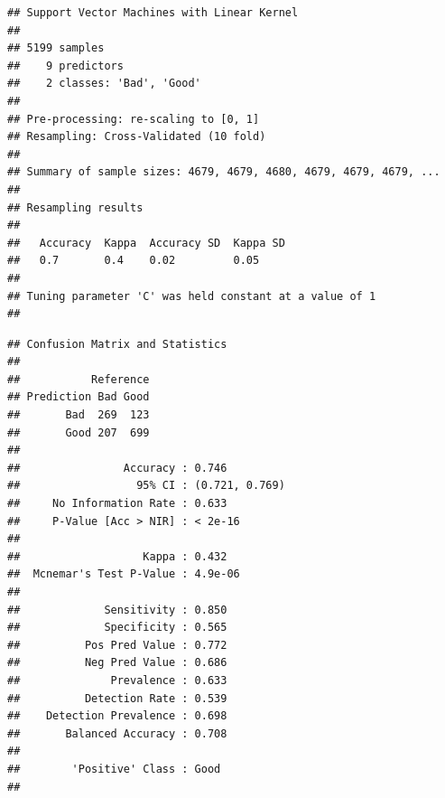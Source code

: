 \documentclass[english,nohyper,titlepage]{tufte-handout}\usepackage{knitr}
\begin{document}
\begin{knitrout}\footnotesize
{}\color{fgcolor}\begin{kframe}
\begin{alltt}
\hlstd{(}\hlstd{)}
 \hlkwb{=} \hlopt{~}  \hlstd{=}\hlstd{,}
                    \hlstd{=}\hlstd{,}  \hlstd{=}\hlstd{)}
\end{alltt}
\begin{verbatim}
## Support Vector Machines with Linear Kernel 
## 
## 5199 samples
##    9 predictors
##    2 classes: 'Bad', 'Good' 
## 
## Pre-processing: re-scaling to [0, 1] 
## Resampling: Cross-Validated (10 fold) 
## 
## Summary of sample sizes: 4679, 4679, 4680, 4679, 4679, 4679, ... 
## 
## Resampling results
## 
##   Accuracy  Kappa  Accuracy SD  Kappa SD
##   0.7       0.4    0.02         0.05    
## 
## Tuning parameter 'C' was held constant at a value of 1
## 
\end{verbatim}
\end{kframe}
\end{knitrout}


\begin{knitrout}\footnotesize
{}\color{fgcolor}\begin{kframe}
\begin{alltt}
 \hlkwb{=} \hlstd{(results_svm, wine_test[,}\hlopt{-}\hlstd{])}
\hlstd{(preds_svm, wine_test[,}\hlstd{],} \hlstd{=}\hlstd{)}
\end{alltt}
\begin{verbatim}
## Confusion Matrix and Statistics
## 
##           Reference
## Prediction Bad Good
##       Bad  269  123
##       Good 207  699
##                                         
##                Accuracy : 0.746         
##                  95% CI : (0.721, 0.769)
##     No Information Rate : 0.633         
##     P-Value [Acc > NIR] : < 2e-16       
##                                         
##                   Kappa : 0.432         
##  Mcnemar's Test P-Value : 4.9e-06       
##                                         
##             Sensitivity : 0.850         
##             Specificity : 0.565         
##          Pos Pred Value : 0.772         
##          Neg Pred Value : 0.686         
##              Prevalence : 0.633         
##          Detection Rate : 0.539         
##    Detection Prevalence : 0.698         
##       Balanced Accuracy : 0.708         
##                                         
##        'Positive' Class : Good          
## 
\end{verbatim}
\end{kframe}
\end{knitrout}
\end{document}
